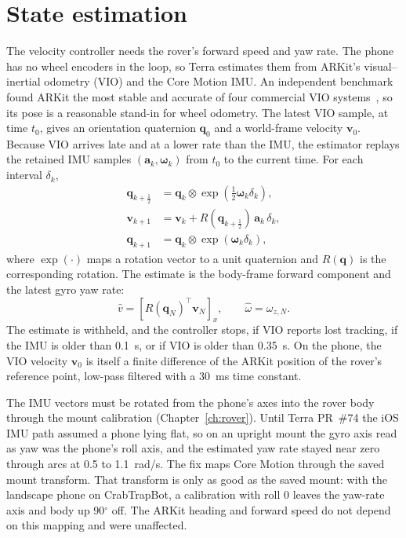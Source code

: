 \section{State estimation}
\label{sec:auto-state}

The velocity controller needs the rover's forward speed and yaw rate.
The phone has no wheel encoders in the loop, so Terra estimates them from ARKit's visual--inertial odometry (VIO) and the Core Motion IMU.
An independent benchmark found ARKit the most stable and accurate of four commercial VIO systems~\citep{kim2022benchmark}, so its pose is a reasonable stand-in for wheel odometry.
The latest VIO sample, at time $t_0$, gives an orientation quaternion $\mathbf{q}_0$ and a world-frame velocity $\mathbf{v}_0$.
Because VIO arrives late and at a lower rate than the IMU, the estimator replays the retained IMU samples $(\mathbf{a}_k, \boldsymbol{\omega}_k)$ from $t_0$ to the current time.
For each interval $\delta_k$,
\begin{align}
  \mathbf{q}_{k+\frac12} &= \mathbf{q}_k \otimes \exp\!\left(\tfrac12 \boldsymbol{\omega}_k \delta_k\right), \\
  \mathbf{v}_{k+1} &= \mathbf{v}_k + R(\mathbf{q}_{k+\frac12})\,\mathbf{a}_k\,\delta_k, \\
  \mathbf{q}_{k+1} &= \mathbf{q}_k \otimes \exp\!\left(\boldsymbol{\omega}_k \delta_k\right),
\end{align}
where $\exp(\cdot)$ maps a rotation vector to a unit quaternion and $R(\mathbf{q})$ is the corresponding rotation.
The estimate is the body-frame forward component and the latest gyro yaw rate:
\begin{equation}
  \hat v = \left[R(\mathbf{q}_N)^{\top} \mathbf{v}_N\right]_x, \qquad \hat\omega = \omega_{z,N}.
\end{equation}
The estimate is withheld, and the controller stops, if VIO reports lost tracking, if the IMU is older than 0.1~s, or if VIO is older than 0.35~s.
On the phone, the VIO velocity $\mathbf{v}_0$ is itself a finite difference of the ARKit position of the rover's reference point, low-pass filtered with a 30~ms time constant.

The IMU vectors must be rotated from the phone's axes into the rover body through the mount calibration (Chapter~\ref{ch:rover}).
Until Terra PR~\#74 the iOS IMU path assumed a phone lying flat, so on an upright mount the gyro axis read as yaw was the phone's roll axis, and the estimated yaw rate stayed near zero through arcs at 0.5 to 1.1~rad/s.
The fix maps Core Motion through the saved mount transform.
That transform is only as good as the saved mount: with the landscape phone on CrabTrapBot, a calibration with roll 0 leaves the yaw-rate axis and body up 90$^\circ$ off.
The ARKit heading and forward speed do not depend on this mapping and were unaffected.

